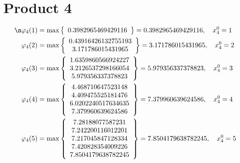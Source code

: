 \documentclass{article}
\begin{document}
\section{Product 4}
\begin{align*}
\n  
  
\varphi_{4}(1) &= \max \left\{ \begin{array}{c}
0.3982965469429116
\end{array} \right\} = 0.3982965469429116, \quad x_{4}^0 = 1\\
  
  
  
  
\varphi_{4}(2) &= \max \left\{ \begin{array}{c}
0.43916426132755193 \\
 3.171786015431965
\end{array} \right\} = 3.171786015431965, \quad x_{4}^0 = 2\\
  
  
  
  
\varphi_{4}(3) &= \max \left\{ \begin{array}{c}
1.6359860566924227 \\
 3.2126537298166054 \\
 5.979356337378823
\end{array} \right\} = 5.979356337378823, \quad x_{4}^0 = 3\\
  
  
  
  
\varphi_{4}(4) &= \max \left\{ \begin{array}{c}
4.468710647523148 \\
 4.409475525181476 \\
 6.0202240517634635 \\
 7.379960639624586
\end{array} \right\} = 7.379960639624586, \quad x_{4}^0 = 4\\
  
  
  
  
\varphi_{4}(5) &= \max \left\{ \begin{array}{c}
7.28188077587231 \\
 7.242200116012201 \\
 7.217045847128334 \\
 7.420828354009226 \\
 7.8504179638782245
\end{array} \right\} = 7.8504179638782245, \quad x_{4}^0 = 5\\
  
  
  

\end{align*}
\end{document}
